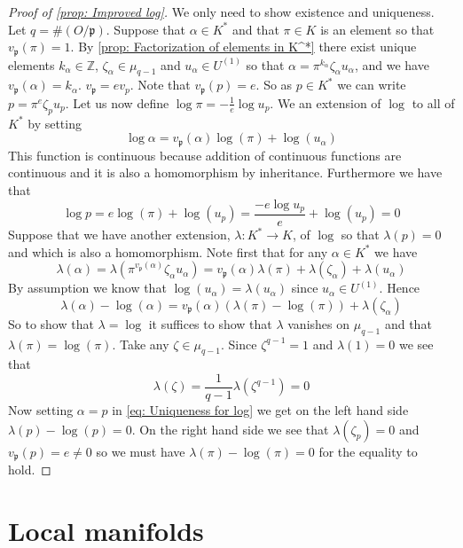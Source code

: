 \documentclass{article}
\newcommand{\mfrak}[1]{\mathfrak{#1}}
\newcommand{\mbb}[1]{\mathbb{#1}}
\numberwithin{equation}{section}
\begin{document}
\begin{proof}[Proof of \cref{prop: Improved log}]
	We only need to show existence and uniqueness. Let $q = \#(O / \mfrak p)$. Suppose that $\alpha \in K^*$ and that $\pi \in K$ is an element so that $v_\mfrak p(\pi) = 1$. By \cref{prop: Factorization of elements in K^*} there exist unique elements $k_\alpha \in \mbb Z$, $\zeta_\alpha \in \mu_{q-1}$ and $u_\alpha \in U^{(1)}$ so that $\alpha = \pi^{k_\alpha} \zeta_\alpha u_\alpha$, and we have $v_\mfrak p(\alpha) = k_\alpha$.
	$v_\mfrak p = e v_p$. Note that $v_{\mfrak p} (p) = e$. So as $p \in K^*$ we can write $p = \pi^{e}\zeta_p u_p$. Let us now define $\log \pi = -\frac{1}{e}\log u_p$. We an extension of $\log$ to all of $K^*$ by setting
	$$\log \alpha = v_\mfrak p(\alpha)\log(\pi) + \log(u_\alpha)$$
	This function is continuous because addition of continuous functions are continuous and it is also a homomorphism by inheritance. Furthermore we have that
	$$\log p = e\log(\pi) + \log(u_p) = \frac{-e\log u_p}{e} + \log(u_p) = 0 $$
	Suppose that we have another extension, $\lambda : K^* \to K$, of $\log$ so that $\lambda(p) = 0$ and which is also a homomorphism. Note first that for any $\alpha \in K^*$ we have
	$$\lambda(\alpha) = \lambda(\pi^{v_\mfrak p(\alpha)}\zeta_\alpha u_\alpha) = {v_\mfrak p(\alpha)}\lambda(\pi) + \lambda(\zeta_\alpha) + \lambda(u_\alpha)$$
	By assumption we know that $\log(u_\alpha) = \lambda(u_\alpha)$ since $u_\alpha \in U^{(1)}$. Hence
	\begin{equation}\label{eq: Uniqueness for log}
    	\lambda(\alpha) - \log(\alpha) = {v_\mfrak p(\alpha)}(\lambda(\pi)-\log(\pi))  + \lambda(\zeta_\alpha)
	\end{equation}
	So to show that $\lambda = \log$ it suffices to show that $\lambda$ vanishes on $\mu_{q-1}$ and that $\lambda(\pi) = \log(\pi)$. Take any $\zeta \in \mu_{q-1}$. Since $\zeta^{q-1} = 1$ and $\lambda(1) = 0$ we see that
	$$\lambda(\zeta) = \frac{1}{q-1}\lambda(\zeta^{q-1}) = 0$$
	Now setting $\alpha = p$ in \cref{eq: Uniqueness for log} we get on the left hand side $\lambda(p) - \log(p) = 0$. On the right hand side we see that $\lambda(\zeta_p) = 0$ and $v_\mfrak p(p) = e \neq 0$ so we must have $\lambda(\pi) - \log(\pi) = 0$ for the equality to hold.
\end{proof}

\section{Local manifolds}
 
\end{document}
